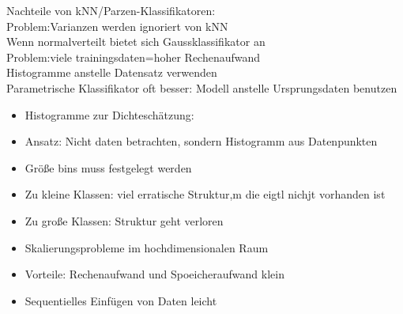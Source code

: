 \documentclass[a4paper,10pt,oneside]{article}
\begin{document}
Nachteile von kNN/Parzen-Klassifikatoren:\\
Problem:Varianzen werden ignoriert von kNN\\
Wenn normalverteilt bietet sich Gaussklassifikator an\\
Problem:viele trainingsdaten=hoher Rechenaufwand\\
Histogramme anstelle Datensatz verwenden\\
Parametrische Klassifikator oft besser: Modell anstelle Ursprungsdaten benutzen

\begin{itemize}
	\item Histogramme zur Dichteschätzung:
	\item Ansatz: Nicht daten betrachten, sondern Histogramm aus Datenpunkten
	\item Größe bins muss festgelegt werden
	\item Zu kleine Klassen: viel erratische Struktur,m die eigtl nichjt vorhanden ist
	\item Zu große Klassen: Struktur geht verloren
	\item Skalierungsprobleme im hochdimensionalen Raum
	\item Vorteile: Rechenaufwand und Spoeicheraufwand klein
	\item Sequentielles Einfügen von Daten leicht
\end{itemize}
\end{document}
